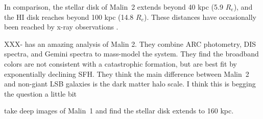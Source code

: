 \documentclass{emulateapj}
\newcommand\msun{\rm{M}_\odot}
\newcommand\HI{\ion{H}{1}}
\begin{document}
In comparison, the stellar disk of Malin~2 extends beyond 40 kpc (5.9 $R_e$), and the HI disk reaches beyond 100 kpc (14.8 $R_e$).  These distances have occasionally been reached by x-ray observations \citep{Buote12}. 







XXX-\citet{Kasparova14} has an amazing analysis of Malin 2.  They combine ARC photometry, DIS spectra, and Gemini spectra to mass-model the system.  They find the broadband colors are not consistent with a catastrophic formation, but are best fit by exponentially declining SFH.  They think the main difference between Malin~2 and non-giant LSB galaxies is the dark matter halo scale.  I think this is begging the question a little bit 


\citet{Galaz15} take deep images of Malin~1 and find the stellar disk extends to 160 kpc.  


\end{document}
